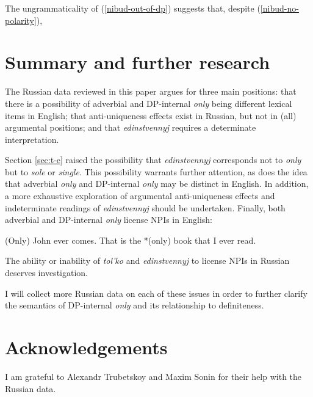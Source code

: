 \documentclass{article}
\begin{document}
The ungrammaticality of (\ref{nibud-out-of-dp}) suggests that, despite (\ref{nibud-no-polarity}), \textit{}


\section{Summary and further research \label{sec:conclusion}}
The Russian data reviewed in this paper argues for three main positions: that there is a possibility of adverbial and DP-internal \textit{only} being different lexical items in English; that anti-uniqueness effects exist in Russian, but not in (all) argumental positions; and that \textit{edinstvennyj} requires a determinate interpretation.

Section \ref{sec:t-e} raised the possibility that \textit{edinstvennyj} corresponds not to \textit{only} but to \textit{sole} or \textit{single}. This possibility warrants further attention, as does the idea that adverbial \textit{only} and DP-internal \textit{only} may be distinct in English. In addition, a more exhaustive exploration of argumental anti-uniqueness effects and indeterminate readings of \textit{edinstvennyj} should be undertaken. Finally, both adverbial and DP-internal \textit{only} license NPIs in English:

\begin{exe}
	\ex *(Only) John ever comes.
	\ex That is the *(only) book that I ever read.
\end{exe}

The ability or inability of \textit{tol'ko} and \textit{edinstvennyj} to license NPIs in Russian deserves investigation.

I will collect more Russian data on each of these issues in order to further clarify the semantics of DP-internal \textit{only} and its relationship to definiteness.

\section*{Acknowledgements}
I am grateful to Alexandr Trubetskoy and Maxim Sonin for their help with the Russian data.



\end{document}

